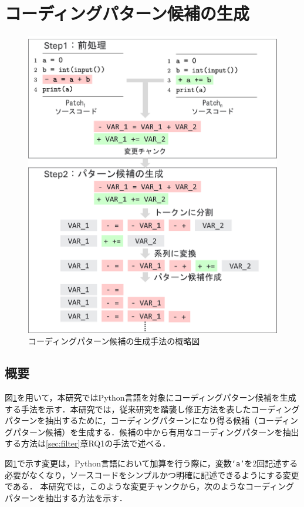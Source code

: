 \documentclass[submit,techrep,noauthor]{ipsj}
\begin{document}
\section{コーディングパターン候補の生成}\label{sec:pattern}
\begin{figure}[h]
\includegraphics[width=0.95\linewidth]{@BSthesis2024_Noguchi/Noguchi_fig/3_chapter.pdf}
\centering
\caption{コーディングパターン候補の生成手法の概略図}
\label{fig:create_pattern}
\end{figure}
\subsection{概要}
図\ref{fig:create_pattern}を用いて，本研究ではPython言語を対象にコーディングパターン候補を生成する手法を示す．本研究では，従来研究を踏襲し修正方法を表したコーディングパターンを抽出するために，コーディングパターンになり得る候補（コーディングパターン候補）を生成する．候補の中から有用なコーディングパターンを抽出する方法は\ref{sec:filter}章RQ1の手法で述べる．

図\ref{fig:create_pattern}で示す変更は，Python言語において加算を行う際に，変数\texttt{`a'}を2回記述する必要がなくなり，ソースコードをシンプルかつ明確に記述できるようにする変更である．
本研究では，このような変更チャンクから，次のようなコーディングパターンを抽出する方法を示す．
\end{document}
